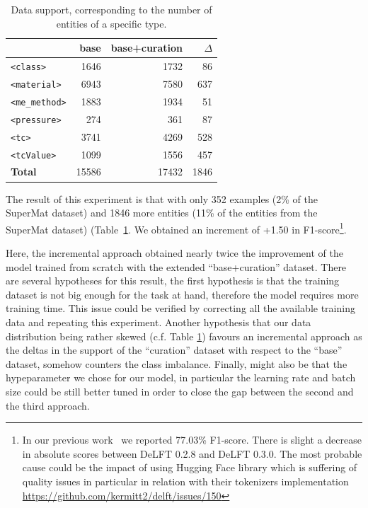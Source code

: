 \documentclass[a4paper]{article}
\begin{document}
\begin{table}[ht]
\centering
\caption{Data support, corresponding to the number of entities of a specific type.}
\begin{tabular}{lrrr}
\toprule
                        & \textbf{base}     & \textbf{base+curation}    & \textbf{$\Delta$}  \\ 
\midrule
\texttt{<class>}        & 1646              & 1732                      &  86                \\
\texttt{<material>}     & 6943              & 7580                      &  637               \\
\texttt{<me\_method>}   & 1883              & 1934                      &  51                \\
\texttt{<pressure>}     & 274               & 361                       &  87                \\
\texttt{<tc>}           & 3741              & 4269                      &  528               \\
\texttt{<tcValue>}      & 1099              & 1556                      &  457               \\
\midrule
\textbf{Total}          & 15586             & 17432                     & 1846               \\ 
\bottomrule
\end{tabular}
\label{tab:training-support}
\end{table}

The result of this experiment is that with only 352 examples (2\% of the SuperMat dataset) and 1846 more entities (11\% of the entities from the SuperMat dataset) (Table~\ref{tab:training-support}. 
We obtained an increment of +1.50 in F1-score\footnote{In our previous work~\cite{lfoppiano2023automatic} we reported 77.03\% F1-score. There is slight a decrease in absolute scores between DeLFT 0.2.8 and DeLFT 0.3.0. The most probable cause could be the impact of using Hugging Face library which is suffering of quality issues in particular in relation with their tokenizers implementation \url{https://github.com/kermitt2/delft/issues/150}}.

Here, the incremental approach obtained nearly twice the improvement of the model trained from scratch with the extended ``base+curation'' dataset. 
There are several hypotheses for this result, the first hypothesis is that the training dataset is not big enough for the task at hand, therefore the model requires more training time. 
This issue could be verified by correcting all the available training data and repeating this experiment. 
Another hypothesis that our data distribution being rather skewed (c.f. Table \ref{tab:training-support}) favours an incremental approach as the deltas in the support of the ``curation'' dataset with respect to the ``base'' dataset,  somehow counters the class imbalance. 
Finally, might also be that the hypeparameter we chose for our model, in particular the learning rate and batch size could be still better tuned in order to close the gap between the second and the third approach.
\end{document}
